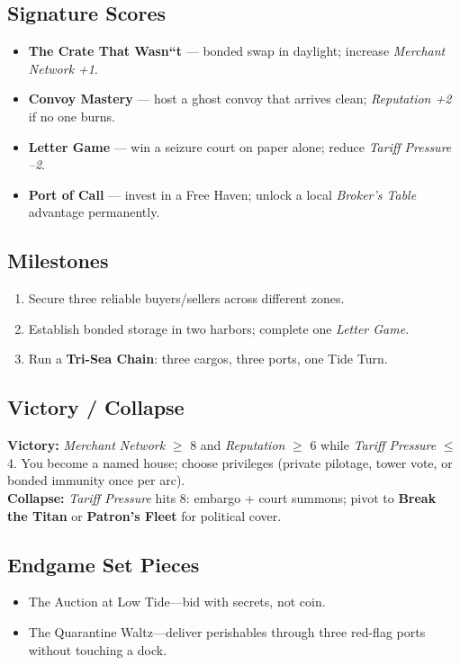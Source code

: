 \documentclass[11pt,oneside]{book}
\begin{document}
\begin{itemize}
\subsection*{Signature Scores}
\begin{itemize}[leftmargin=*,itemsep=2pt]
  \item \textbf{The Crate That Wasn``t} --- bonded swap in daylight; increase \emph{Merchant Network +1}.
  \item \textbf{Convoy Mastery} --- host a ghost convoy that arrives clean; \emph{Reputation +2} if no one burns.
  \item \textbf{Letter Game} --- win a seizure court on paper alone; reduce \emph{Tariff Pressure --2}.
  \item \textbf{Port of Call} --- invest in a Free Haven; unlock a local \emph{Broker's Table} advantage permanently.
\end{itemize}

\subsection*{Milestones}
\begin{enumerate}[leftmargin=*,itemsep=2pt]
  \item Secure three reliable buyers/sellers across different zones.
  \item Establish bonded storage in two harbors; complete one \emph{Letter Game}.
  \item Run a \textbf{Tri-Sea Chain}: three cargos, three ports, one Tide Turn.
\end{enumerate}

\subsection*{Victory / Collapse}
\textbf{Victory:} \emph{Merchant Network} \(\geq\) 8 and \emph{Reputation} \(\geq\) 6 while \emph{Tariff Pressure} \(\leq\) 4. You become a named house; choose privileges (private pilotage, tower vote, or bonded immunity once per arc).\\
\textbf{Collapse:} \emph{Tariff Pressure} hits 8: embargo + court summons; pivot to \textbf{Break the Titan} or \textbf{Patron's Fleet} for political cover.

\subsection*{Endgame Set Pieces}
\begin{itemize}[leftmargin=*,itemsep=2pt]
  \item The Auction at Low Tide---bid with secrets, not coin.
  \item The Quarantine Waltz---deliver perishables through three red-flag ports without touching a dock.
\end{itemize}


\end{itemize}
\end{document}
